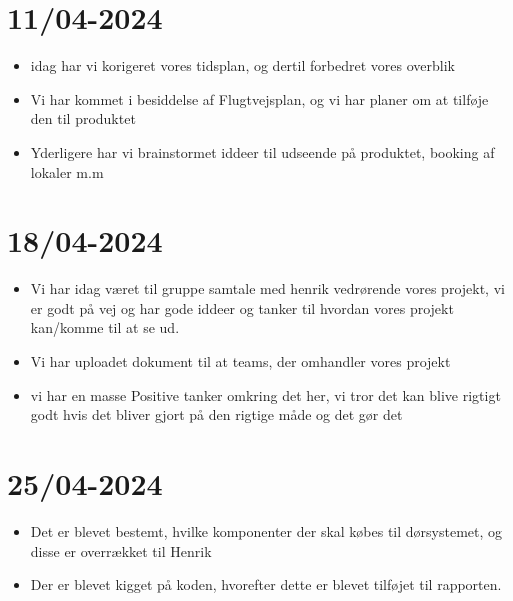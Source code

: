 \documentclass[12pt, a4paper]{article}
\begin{document}
    \section{11/04-2024}
        \begin{itemize}
            \item idag har vi korigeret vores tidsplan, og dertil forbedret vores overblik
            \item Vi har kommet i besiddelse af Flugtvejsplan, og vi har planer om at tilføje den til produktet
            \item Yderligere har vi brainstormet iddeer til udseende på produktet, booking af lokaler m.m
        \end{itemize}

    \section{18/04-2024}
        \begin{itemize}
            \item Vi har idag været til gruppe samtale med henrik vedrørende vores projekt, vi er godt på vej og har gode iddeer og tanker til hvordan vores projekt kan/komme til at se ud.
            \item Vi har uploadet dokument til at teams, der omhandler vores projekt
            \item vi har en masse Positive tanker omkring det her, vi tror det kan blive rigtigt godt hvis det bliver gjort på den rigtige måde og det gør det
        \end{itemize}

    \section{25/04-2024}
        \begin{itemize}
            \item Det er  blevet bestemt, hvilke komponenter der skal købes til dørsystemet, og disse er overrækket til Henrik
            \item Der er blevet kigget på koden, hvorefter dette er blevet tilføjet til rapporten.
        \end{itemize}
\end{document}
